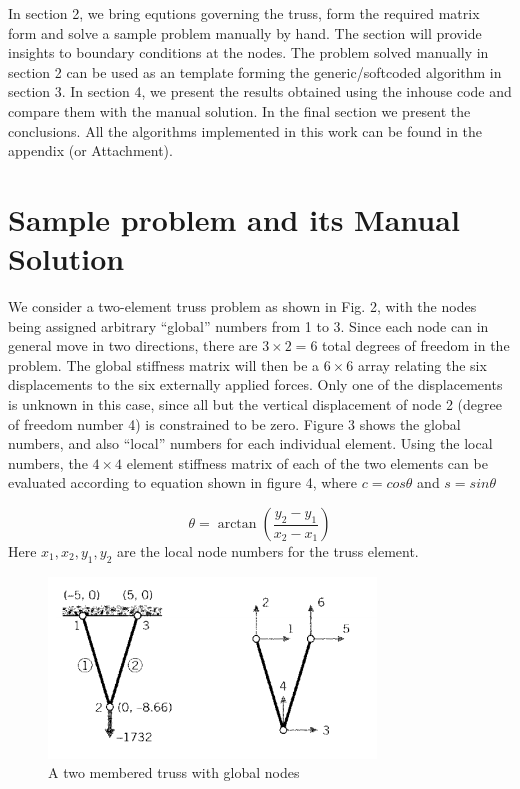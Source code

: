 \documentclass{article}
\begin{document}
In section 2, we bring equtions governing the truss, form the required matrix form and solve a sample problem manually by hand. The section will provide insights to boundary conditions at the nodes. The problem solved manually in section 2 can be used as an template forming the generic/softcoded algorithm in section 3. In section 4, we present the results obtained using the inhouse code and  compare them with the manual solution. In the final section we present the conclusions. All the algorithms implemented in this work can be found in the appendix (or Attachment).

\section{Sample problem and its Manual Solution}

We consider a two-element truss problem as shown in Fig. 2, with the nodes being assigned arbitrary “global” numbers from 1 to 3. Since each node can in general move in two directions, there are $3 \times 2 = 6$ total degrees of freedom in the problem. The global stiffness matrix will then be a $6 \times 6$ array relating the six displacements to the six externally applied forces. Only one of the displacements is unknown in this case, since all but the vertical displacement of node 2 (degree of freedom number 4) is constrained to be zero. Figure 3 shows the global numbers, and also “local” numbers for each individual element. Using the local numbers, the $4\times4$ element stiffness matrix of each of the two elements can be evaluated according to equation shown in figure 4, where $c=cos\theta$ and $s = sin\theta$

\begin{equation}
\theta = \arctan\left(\frac{y_2-y_1}{x_2-x_1}\right)
\end{equation}
Here $x_1, x_2, y_1, y_2$ are the local node numbers for the truss element.
\begin{figure}[h!]
\centering
\includegraphics[scale=.7]{1.png}
\caption{A two membered truss with global nodes}
\label{fig:fig1}
\end{figure}
\end{document}
